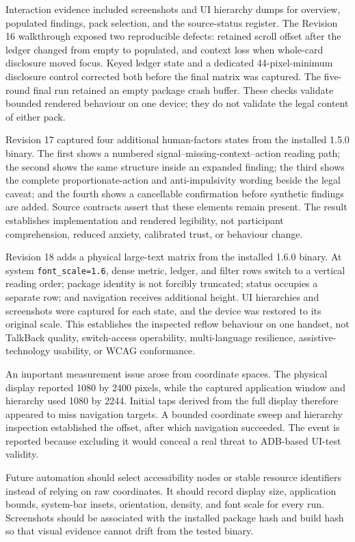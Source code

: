 Interaction evidence included screenshots and UI hierarchy dumps for overview, populated findings, pack selection, and the source-status register. The Revision 16 walkthrough exposed two reproducible defects: retained scroll offset after the ledger changed from empty to populated, and context loss when whole-card disclosure moved focus. Keyed ledger state and a dedicated 44-pixel-minimum disclosure control corrected both before the final matrix was captured. The five-round final run retained an empty package crash buffer. These checks validate bounded rendered behaviour on one device; they do not validate the legal content of either pack.

Revision 17 captured four additional human-factors states from the installed 1.5.0 binary. The first shows a numbered signal--missing-context--action reading path; the second shows the same structure inside an expanded finding; the third shows the complete proportionate-action and anti-impulsivity wording beside the legal caveat; and the fourth shows a cancellable confirmation before synthetic findings are added. Source contracts assert that these elements remain present. The result establishes implementation and rendered legibility, not participant comprehension, reduced anxiety, calibrated trust, or behaviour change.

Revision 18 adds a physical large-text matrix from the installed 1.6.0 binary. At system \texttt{font\_scale=1.6}, dense metric, ledger, and filter rows switch to a vertical reading order; package identity is not forcibly truncated; status occupies a separate row; and navigation receives additional height. UI hierarchies and screenshots were captured for each state, and the device was restored to its original scale. This establishes the inspected reflow behaviour on one handset, not TalkBack quality, switch-access operability, multi-language resilience, assistive-technology usability, or WCAG conformance.

An important measurement issue arose from coordinate spaces. The physical display reported 1080 by 2400 pixels, while the captured application window and hierarchy used 1080 by 2244. Initial taps derived from the full display therefore appeared to miss navigation targets. A bounded coordinate sweep and hierarchy inspection established the offset, after which navigation succeeded. The event is reported because excluding it would conceal a real threat to ADB-based UI-test validity.

Future automation should select accessibility nodes or stable resource identifiers instead of relying on raw coordinates. It should record display size, application bounds, system-bar insets, orientation, density, and font scale for every run. Screenshots should be associated with the installed package hash and build hash so that visual evidence cannot drift from the tested binary.

